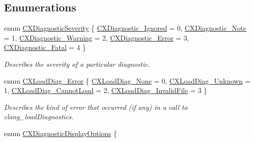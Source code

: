 \subsection*{Enumerations}
\begin{DoxyCompactItemize}
\item 
enum \mbox{\hyperlink{group__CINDEX__DIAG_gabff210a02d448bf64e8aee79b2241370}{C\+X\+Diagnostic\+Severity}} \{ \newline
\mbox{\hyperlink{group__CINDEX__DIAG_ggabff210a02d448bf64e8aee79b2241370a6bc5575700fec4fcde75bb88ab85eb21}{C\+X\+Diagnostic\+\_\+\+Ignored}} = 0, 
\mbox{\hyperlink{group__CINDEX__DIAG_ggabff210a02d448bf64e8aee79b2241370abd868cb73ea129d1f77476211fea4494}{C\+X\+Diagnostic\+\_\+\+Note}} = 1, 
\mbox{\hyperlink{group__CINDEX__DIAG_ggabff210a02d448bf64e8aee79b2241370af4384404f204c3bbb614e5ee2654426e}{C\+X\+Diagnostic\+\_\+\+Warning}} = 2, 
\mbox{\hyperlink{group__CINDEX__DIAG_ggabff210a02d448bf64e8aee79b2241370ae896fe295133ecfe92587bf4dffcd994}{C\+X\+Diagnostic\+\_\+\+Error}} = 3, 
\newline
\mbox{\hyperlink{group__CINDEX__DIAG_ggabff210a02d448bf64e8aee79b2241370a5df88ea55245aedf53ab0f4ce3a6737c}{C\+X\+Diagnostic\+\_\+\+Fatal}} = 4
 \}
\begin{DoxyCompactList}\small\item\em Describes the severity of a particular diagnostic. \end{DoxyCompactList}\item 
enum \mbox{\hyperlink{group__CINDEX__DIAG_gafccf4d49329805ac24e6dc005aafc848}{C\+X\+Load\+Diag\+\_\+\+Error}} \{ \mbox{\hyperlink{group__CINDEX__DIAG_ggafccf4d49329805ac24e6dc005aafc848a2aeb81c1571c99b95cdce1b6b5b9b3d5}{C\+X\+Load\+Diag\+\_\+\+None}} = 0, 
\mbox{\hyperlink{group__CINDEX__DIAG_ggafccf4d49329805ac24e6dc005aafc848a3b56c96ea13c1d67e23297924674ce1b}{C\+X\+Load\+Diag\+\_\+\+Unknown}} = 1, 
\mbox{\hyperlink{group__CINDEX__DIAG_ggafccf4d49329805ac24e6dc005aafc848ac08b95e9ba65ec7436038554d74f795e}{C\+X\+Load\+Diag\+\_\+\+Cannot\+Load}} = 2, 
\mbox{\hyperlink{group__CINDEX__DIAG_ggafccf4d49329805ac24e6dc005aafc848ad06582a09b2adbbded48bde1106214d6}{C\+X\+Load\+Diag\+\_\+\+Invalid\+File}} = 3
 \}
\begin{DoxyCompactList}\small\item\em Describes the kind of error that occurred (if any) in a call to {\ttfamily clang\+\_\+load\+Diagnostics}. \end{DoxyCompactList}\item 
enum \mbox{\hyperlink{group__CINDEX__DIAG_ga0545c7c3ef36a397c44d142b0385b8d1}{C\+X\+Diagnostic\+Display\+Options}} \{ \newline

\end{DoxyCompactItemize}
